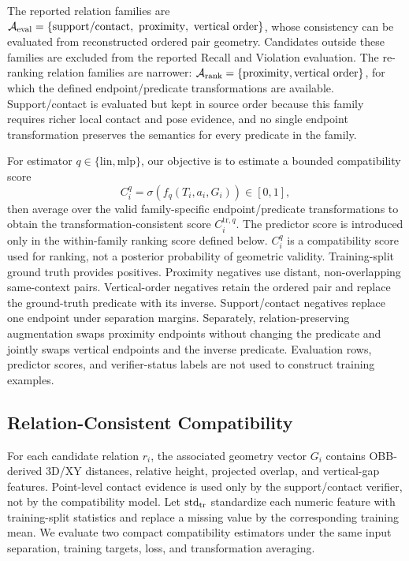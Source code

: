 \documentclass[letterpaper]{article}
\begin{document}
The reported relation families are
$\mathcal{A}_{\rm eval}=\{\mathrm{support/contact},\ \mathrm{proximity},\ \mathrm{vertical\ order}\}$,
whose consistency can be evaluated from reconstructed ordered pair geometry. Candidates outside these families are excluded from the reported Recall and Violation evaluation. The re-ranking relation families are narrower: $\mathcal A_{\rm rank}=\{\mathrm{proximity},\mathrm{vertical\ order}\}$, for which the defined endpoint/predicate transformations are available. Support/contact is evaluated but kept in source order because this family requires richer local contact and pose evidence, and no single endpoint transformation preserves the semantics for every predicate in the family.

For estimator $q\in\{\mathrm{lin},\mathrm{mlp}\}$, our objective is to estimate a bounded compatibility score
\begin{equation}
C_i^q=\sigma\!\left(f_q(T_i,a_i,G_i)\right)\in[0,1],
\end{equation}
then average over the valid family-specific endpoint/predicate transformations to obtain the transformation-consistent score $C_i^{\mathrm{tr},q}$. The predictor score is introduced only in the within-family ranking score defined below. $C_i^q$ is a compatibility score used for ranking, not a posterior probability of geometric validity. Training-split ground truth provides positives. Proximity negatives use distant, non-overlapping same-context pairs. Vertical-order negatives retain the ordered pair and replace the ground-truth predicate with its inverse. Support/contact negatives replace one endpoint under separation margins. Separately, relation-preserving augmentation swaps proximity endpoints without changing the predicate and jointly swaps vertical endpoints and the inverse predicate. Evaluation rows, predictor scores, and verifier-status labels are not used to construct training examples.

\subsection{Relation-Consistent Compatibility}
\label{sec:Compatibility}
For each candidate relation $r_i$, the associated geometry vector $G_i$ contains OBB-derived 3D/XY distances, relative height, projected overlap, and vertical-gap features. Point-level contact evidence is used only by the support/contact verifier, not by the compatibility model. Let $\operatorname{std}_{\rm tr}$ standardize each numeric feature with training-split statistics and replace a missing value by the corresponding training mean. We evaluate two compact compatibility estimators under the same input separation, training targets, loss, and transformation averaging.
\end{document}
